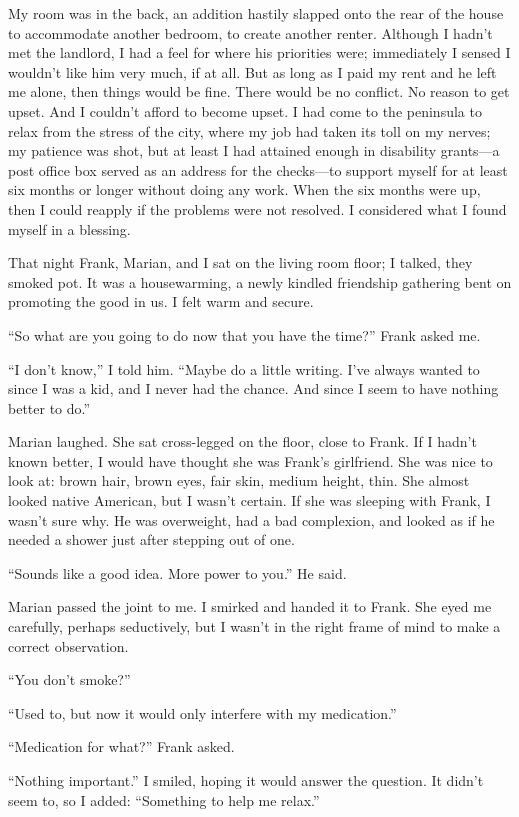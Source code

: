 My room was in the back, an addition hastily slapped onto the rear of
the house to accommodate another bedroom, to create another renter.
Although I hadn't met the landlord, I had a feel for where his
priorities were; immediately I sensed I wouldn't like him very much, if
at all. But as long as I paid my rent and he left me alone, then things
would be fine. There would be no conflict. No reason to get upset. And I
couldn't afford to become upset. I had come to the peninsula to relax
from the stress of the city, where my job had taken its toll on my
nerves; my patience was shot, but at least I had attained enough in
disability grants---a post office box served as an address for the
checks---to support myself for at least six months or longer without
doing any work. When the six months were up, then I could reapply if the
problems were not resolved. I considered what I found myself in a
blessing.

That night Frank, Marian, and I sat on the living room floor; I talked,
they smoked pot. It was a housewarming, a newly kindled friendship
gathering bent on promoting the good in us. I felt warm and secure.

``So what are you going to do now that you have the time?'' Frank asked
me.

``I don't know,'' I told him. ``Maybe do a little writing. I've always
wanted to since I was a kid, and I never had the chance. And since I
seem to have nothing better to do.''

Marian laughed. She sat cross-legged on the floor, close to Frank. If I
hadn't known better, I would have thought she was Frank's girlfriend.
She was nice to look at: brown hair, brown eyes, fair skin, medium
height, thin. She almost looked native American, but I wasn't certain.
If she was sleeping with Frank, I wasn't sure why. He was overweight,
had a bad complexion, and looked as if he needed a shower just after
stepping out of one.

``Sounds like a good idea. More power to you.'' He said.

Marian passed the joint to me. I smirked and handed it to Frank. She
eyed me carefully, perhaps seductively, but I wasn't in the right frame
of mind to make a correct observation.

``You don't smoke?''

``Used to, but now it would only interfere with my medication.''

``Medication for what?'' Frank asked.

``Nothing important.'' I smiled, hoping it would answer the question. It
didn't seem to, so I added: ``Something to help me relax.''

